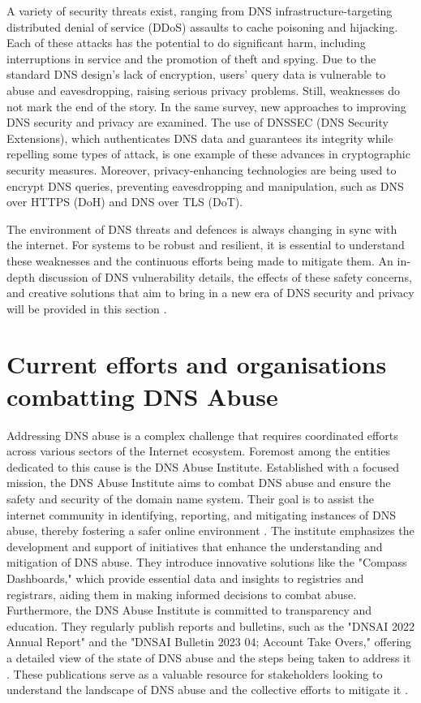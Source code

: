 A variety of security threats exist, ranging from DNS infrastructure-targeting distributed denial of service (DDoS) assaults to cache poisoning and hijacking. Each of these attacks has the potential to do significant harm, including interruptions in service and the promotion of theft and spying. Due to the standard DNS design's lack of encryption, users' query data is vulnerable to abuse and eavesdropping, raising serious privacy problems. Still, weaknesses do not mark the end of the story. In the same survey, new approaches to improving DNS security and privacy are examined. The use of DNSSEC (DNS Security Extensions), which authenticates DNS data and guarantees its integrity while repelling some types of attack, is one example of these advances in cryptographic security measures. Moreover, privacy-enhancing technologies are being used to encrypt DNS queries, preventing eavesdropping and manipulation, such as DNS over HTTPS (DoH) and DNS over TLS (DoT).

The environment of DNS threats and defences is always changing in sync with the internet. For systems to be robust and resilient, it is essential to understand these weaknesses and the continuous efforts being made to mitigate them. An in-depth discussion of DNS vulnerability details, the effects of these safety concerns, and creative solutions that aim to bring in a new era of DNS security and privacy will be provided in this section \cite{sciencedirect2023dns}.

\section{Current efforts and organisations combatting DNS Abuse}

Addressing DNS abuse is a complex challenge that requires coordinated efforts across various sectors of the Internet ecosystem. Foremost among the entities dedicated to this cause is the DNS Abuse Institute. Established with a focused mission, the DNS Abuse Institute aims to combat DNS abuse and ensure the safety and security of the domain name system. Their goal is to assist the internet community in identifying, reporting, and mitigating instances of DNS abuse, thereby fostering a safer online environment \cite{dnsabuseinstitute2023}. The institute emphasizes the development and support of initiatives that enhance the understanding and mitigation of DNS abuse. They introduce innovative solutions like the "Compass Dashboards," which provide essential data and insights to registries and registrars, aiding them in making informed decisions to combat abuse. Furthermore, the DNS Abuse Institute is committed to transparency and education. They regularly publish reports and bulletins, such as the "DNSAI 2022 Annual Report" and the "DNSAI Bulletin 2023 04; Account Take Overs," offering a detailed view of the state of DNS abuse and the steps being taken to address it \cite{dnsabuseinstitute2023} . These publications serve as a valuable resource for stakeholders looking to understand the landscape of DNS abuse and the collective efforts to mitigate it  \cite{dnsai2022report}.

